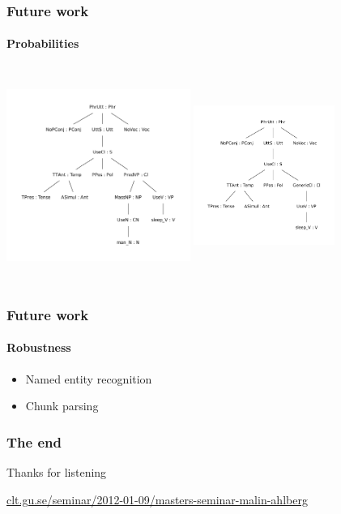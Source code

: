 \documentclass[10pt]{beamer}
\renewcommand{\baselinestretch}{1.5}
\begin{document}
\begin{frame}
\renewcommand{\baselinestretch}{1.0}
\frametitle{Future work}
\framesubtitle{Probabilities} 
\includegraphics[width=170pt,height=200pt]{mana1.pdf}
\includegraphics[width=130pt,height=200pt]{mana.pdf}
\end{frame}


\begin{frame}
\frametitle{Future work}
\framesubtitle{Robustness} 
\begin{itemize}
\item Named entity recognition\\
\item Chunk parsing \\
\end{itemize}
\end{frame}


\begin{frame}
    \frametitle{The end}
\large\begin{center}Thanks for listening\end{center}
\small{\url{clt.gu.se/seminar/2012-01-09/masters-seminar-malin-ahlberg}}
\end{frame}
\end{document}
